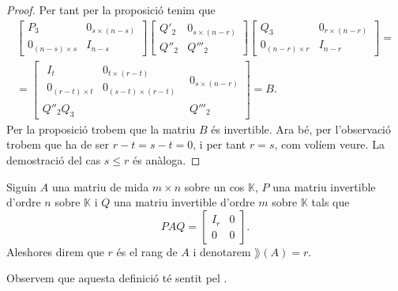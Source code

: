 \documentclass[../../Main.tex]{subfiles}
\begin{document}
\begin{theorem}
\begin{proof}
			Per tant per la proposició  tenim que
			\begin{multline*}
			\left[\begin{array}{c|c}
			P_{3} & 0_{s\times(n-s)} \\\hline
			0_{(n-s)\times s} & I_{n-s}
			\end{array}\right]
			\left[\begin{array}{c|c}
			Q'_{2} & 0_{s\times(n-r)} \\\hline
			Q''_{2} & Q'''_{2}
			\end{array}\right]
			\left[\begin{array}{c|c}
			Q_{3} & 0_{r\times(n-r)} \\\hline
			0_{(n-r)\times r} & I_{n-r}
			\end{array}\right]=\\=
			\left[\begin{array}{c|c}
				\begin{array}{c|c}
				I_{t} & 0_{t\times(r-t)} \\\hline
				0_{(r-t)\times t} & 0_{(s-t)\times(r-t)}
				\end{array}
			& 0_{s\times(n-r)} \\\hline
			Q''_{2}Q_{3} & Q'''_{2}
			\end{array}\right]=B.
			\end{multline*}
			Per la proposició  trobem que la matriu \(B\) és invertible. Ara bé, per l'observació  trobem que ha de ser \(r-t=s-t=0\), i per tant \(r=s\), com volíem veure. La demostració del cas \(s\leq r\) és anàloga.
		\end{proof}
	\end{theorem}
	\begin{definition}[Rang]
		\label{def:rang d'una matriu}
		Siguin \(A\) una matriu de mida \(m\times n\) sobre un cos \(\mathbb{K}\), \(P\) una matriu invertible d'ordre \(n\) sobre \(\mathbb{K}\) i \(Q\) una matriu invertible d'ordre \(m\) sobre \(\mathbb{K}\) tals que
		\[PAQ=\left[\begin{array}{c|c}
		I_{r} & 0 \\\hline
		0 & 0
		\end{array}\right].\]
		Aleshores direm que \(r\) és el rang de \(A\) i denotarem \(\rang(A)=r\).
		
		Observem que aquesta definició té sentit pel .
	\end{definition}
\end{document}
